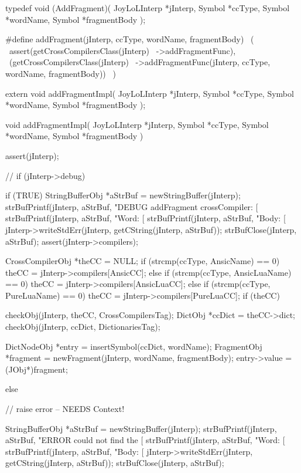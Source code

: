 {\startTestSuite[addFragment]

\startCHeader
typedef void (AddFragment)(
  JoyLoLInterp *jInterp,
  Symbol       *ccType,
  Symbol       *wordName,
  Symbol       *fragmentBody
);

#define addFragment(jInterp, ccType, wordName, fragmentBody)      \
  (                                                               \
    assert(getCrossCompilersClass(jInterp)                        \
      ->addFragmentFunc),                                         \
    (getCrossCompilersClass(jInterp)                              \
      ->addFragmentFunc(jInterp, ccType, wordName, fragmentBody)) \
  )
\stopCHeader

\setCHeaderStream{private}
\startCHeader
extern void addFragmentImpl(
  JoyLoLInterp *jInterp,
  Symbol       *ccType,
  Symbol       *wordName,
  Symbol       *fragmentBody
);
\stopCHeader
\setCHeaderStream{public}

\startCCode
void addFragmentImpl(
  JoyLoLInterp *jInterp,
  Symbol       *ccType,
  Symbol       *wordName,
  Symbol       *fragmentBody
) {
  assert(jInterp);

//  if (jInterp->debug) {
  if (TRUE) {
    StringBufferObj *aStrBuf = newStringBuffer(jInterp);
    strBufPrintf(jInterp, aStrBuf, 
      "DEBUG addFragment crossCompiler: [%
    strBufPrintf(jInterp, aStrBuf, "Word: [%
    strBufPrintf(jInterp, aStrBuf, "Body: [%
    jInterp->writeStdErr(jInterp, getCString(jInterp, aStrBuf));
    strBufClose(jInterp, aStrBuf);
  }
  assert(jInterp->compilers);

  CrossCompilerObj *theCC = NULL;
  if (strcmp(ccType, AnsicName) == 0) {
    theCC = jInterp->compilers[AnsicCC];
  } else if (strcmp(ccType, AnsicLuaName) == 0) {
    theCC = jInterp->compilers[AnsicLuaCC];
  } else if (strcmp(ccType, PureLuaName) == 0) {
    theCC = jInterp->compilers[PureLuaCC];
  }
  if (theCC) {
    checkObj(jInterp, theCC, CrossCompilersTag);
    DictObj *ccDict = theCC->dict;
    checkObj(jInterp, ccDict, DictionariesTag);
    
    DictNodeObj *entry    = insertSymbol(ccDict, wordName);
    FragmentObj *fragment =
      newFragment(jInterp, wordName, fragmentBody);
    entry->value = (JObj*)fragment;
  } else {
    // raise error -- NEEDS Context!
    
    StringBufferObj *aStrBuf = newStringBuffer(jInterp);
    strBufPrintf(jInterp, aStrBuf, 
      "ERROR could not find the [%
    strBufPrintf(jInterp, aStrBuf, "Word: [%
    strBufPrintf(jInterp, aStrBuf, "Body: [%
    jInterp->writeStdErr(jInterp, getCString(jInterp, aStrBuf));
    strBufClose(jInterp, aStrBuf);
  }
}

}}
